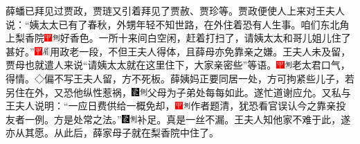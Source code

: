 薛蟠已拜见过贾政，贾琏又引着拜见了贾赦、贾珍等。贾政便使人上来对王夫人说：``姨太太已有了春秋，外甥年轻不知世路，在外住着恐有人生事。咱们东北角上梨香院{\includegraphics[width=3mm]{../Images/00002}\includegraphics[width=3mm]{../Images/00011}\footnotesize \kaishu 好香色。}一所十来间白空闲，赶着打扫了，请姨太太和哥儿姐儿住了甚好。''{\includegraphics[width=3mm]{../Images/00002}\includegraphics[width=3mm]{../Images/00010}\footnotesize \kaishu 用政老一段，不但王夫人得体，且薛母亦免靠亲之嫌。}王夫人未及留，贾母也就遣人来说``请姨太太就在这里住下，大家亲密些''等语。{\includegraphics[width=3mm]{../Images/00002}\includegraphics[width=3mm]{../Images/00011}\footnotesize \kaishu 老太君口气，得情。◇偏不写王夫人留，方不死板。}薛姨妈正要同居一处，方可拘紧些儿子，若另住在外，又恐他纵性惹祸，{\includegraphics[width=3mm]{../Images/00006}\includegraphics[width=3mm]{../Images/00011}\footnotesize \kaishu 父母为子弟处每每如此。}遂忙道谢应允。又私与王夫人说明：``一应日费供给一概免却，{\includegraphics[width=3mm]{../Images/00002}\includegraphics[width=3mm]{../Images/00011}\footnotesize \kaishu 作者题清，犹恐看官误认今之靠亲投友者一例。}方是处常之法。''{\includegraphics[width=3mm]{../Images/00006}\includegraphics[width=3mm]{../Images/00011}\footnotesize \kaishu 补足。真是一丝不漏。}王夫人知他家不难于此，遂亦从其愿。从此后，薛家母子就在梨香院中住了。

